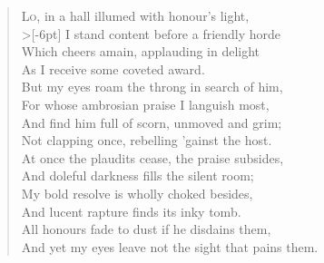 \documentclass[a5paper, 12pt, oneside]{memoir}
\begin{document}
\PoemTitle{}
\begin{verse}
    \lettrine{L}{o}, in a hall illumed with honour's light, \\>[-6pt]
    I stand content before a friendly horde \\
    Which cheers amain, applauding in delight \\
    As I receive some coveted award. \\
    But my eyes roam the throng in search of him, \\
    For whose ambrosian praise I languish most, \\
    And find him full of scorn, unmoved and grim; \\
    Not clapping once, rebelling 'gainst the host. \\
    At once the plaudits cease, the praise subsides, \\
    And doleful darkness fills the silent room; \\
    My bold resolve is wholly choked besides, \\
    And lucent rapture finds its inky tomb. \\
    \vin All honours fade to dust if he disdains them, \\
    \vin And yet my eyes leave not the sight that pains them.
\end{verse}
\end{document}
